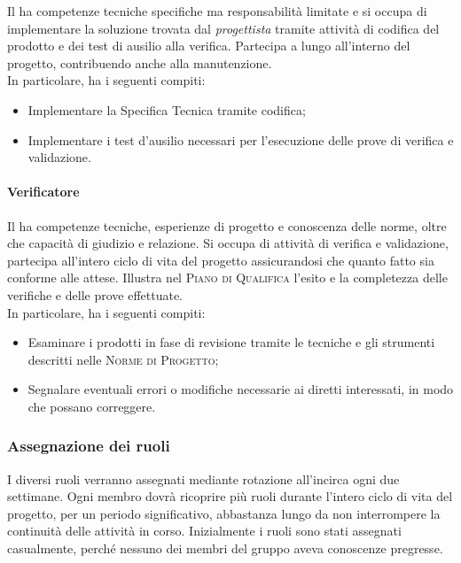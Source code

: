 Il \emph{} ha competenze tecniche specifiche ma responsabilità limitate e si occupa di 
implementare la soluzione trovata dal \emph{progettista} tramite attività di codifica del prodotto e dei test di 
ausilio alla verifica. Partecipa a lungo all'interno del progetto, contribuendo anche alla manutenzione.\\
In particolare, ha i seguenti compiti:
\begin{itemize}
    \item Implementare la Specifica Tecnica tramite codifica;
    \item Implementare i test d'ausilio necessari per l'esecuzione delle prove di verifica e validazione.
\end{itemize}

\paragraph{Verificatore}

Il \emph{} ha competenze tecniche, esperienze di progetto e conoscenza delle norme, oltre che 
capacità di giudizio e relazione. Si occupa di attività di verifica e validazione, partecipa all'intero ciclo di vita 
del progetto assicurandosi che quanto fatto sia conforme alle attese. Illustra nel \textsc{Piano di Qualifica} l'esito 
e la completezza delle verifiche e delle prove effettuate.\\
In particolare, ha i seguenti compiti:
\begin{itemize}
    \item Esaminare i prodotti in fase di revisione tramite le tecniche e gli strumenti descritti nelle \textsc{Norme di Progetto};
    \item Segnalare eventuali errori o modifiche necessarie ai diretti interessati, in modo che possano correggere.
\end{itemize}

\subsubsection{Assegnazione dei ruoli}

I diversi ruoli verranno assegnati mediante rotazione all'incirca ogni due settimane. Ogni membro 
dovrà ricoprire più ruoli durante l'intero ciclo di vita del progetto, per un periodo significativo, abbastanza lungo 
da non interrompere la continuità delle attività in corso. Inizialmente i ruoli sono stati assegnati casualmente, 
perché nessuno dei membri del gruppo aveva conoscenze pregresse. 

